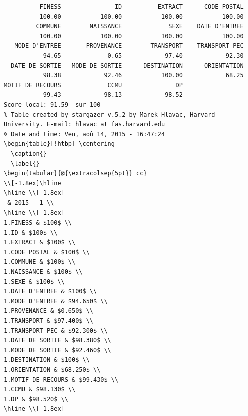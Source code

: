 \documentclass[]{article}
\begin{document}
\begin{verbatim}
          FINESS               ID          EXTRACT      CODE POSTAL 
          100.00           100.00           100.00           100.00 
         COMMUNE        NAISSANCE             SEXE    DATE D'ENTREE 
          100.00           100.00           100.00           100.00 
   MODE D'ENTREE       PROVENANCE        TRANSPORT    TRANSPORT PEC 
           94.65             0.65            97.40            92.30 
  DATE DE SORTIE   MODE DE SORTIE      DESTINATION      ORIENTATION 
           98.38            92.46           100.00            68.25 
MOTIF DE RECOURS             CCMU               DP 
           99.43            98.13            98.52 
Score local: 91.59  sur 100
% Table created by stargazer v.5.2 by Marek Hlavac, Harvard University. E-mail: hlavac at fas.harvard.edu
% Date and time: Ven, aoû 14, 2015 - 16:47:24
\begin{table}[!htbp] \centering 
  \caption{} 
  \label{} 
\begin{tabular}{@{\extracolsep{5pt}} cc} 
\\[-1.8ex]\hline 
\hline \\[-1.8ex] 
 & 2015 - 1 \\ 
\hline \\[-1.8ex] 
1.FINESS & $100$ \\ 
1.ID & $100$ \\ 
1.EXTRACT & $100$ \\ 
1.CODE POSTAL & $100$ \\ 
1.COMMUNE & $100$ \\ 
1.NAISSANCE & $100$ \\ 
1.SEXE & $100$ \\ 
1.DATE D'ENTREE & $100$ \\ 
1.MODE D'ENTREE & $94.650$ \\ 
1.PROVENANCE & $0.650$ \\ 
1.TRANSPORT & $97.400$ \\ 
1.TRANSPORT PEC & $92.300$ \\ 
1.DATE DE SORTIE & $98.380$ \\ 
1.MODE DE SORTIE & $92.460$ \\ 
1.DESTINATION & $100$ \\ 
1.ORIENTATION & $68.250$ \\ 
1.MOTIF DE RECOURS & $99.430$ \\ 
1.CCMU & $98.130$ \\ 
1.DP & $98.520$ \\ 
\hline \\[-1.8ex] 

\end{verbatim}
\end{document}
